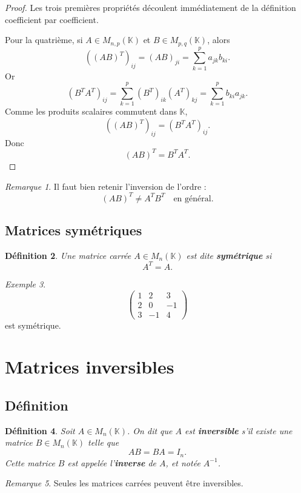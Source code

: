 \documentclass[11pt,a4paper]{article}
\newtheorem{definition}{Définition}[section]
\theoremstyle{remark}
\newtheorem{remarque}[definition]{Remarque}
\newtheorem{exemple}[definition]{Exemple}
\newcommand{\K}{\mathbb{K}}
\begin{document}
\begin{proof}
Les trois premières propriétés découlent immédiatement de la définition coefficient par coefficient.

Pour la quatrième, si \(A\in M_{n,p}(\K)\) et \(B\in M_{p,q}(\K)\), alors
\[
((AB)^T)_{ij}=(AB)_{ji}=\sum_{k=1}^p a_{jk}b_{ki}.
\]
Or
\[
(B^TA^T)_{ij}=\sum_{k=1}^p (B^T)_{ik}(A^T)_{kj}
=\sum_{k=1}^p b_{ki}a_{jk}.
\]
Comme les produits scalaires commutent dans \(\K\),
\[
((AB)^T)_{ij}=(B^TA^T)_{ij}.
\]
Donc
\[
(AB)^T=B^TA^T.
\]
\end{proof}

\begin{remarque}
Il faut bien retenir l’inversion de l’ordre :
\[
(AB)^T\neq A^TB^T \quad \text{en général.}
\]
\end{remarque}

\subsection{Matrices symétriques}

\begin{definition}
Une matrice carrée \(A\in M_n(\K)\) est dite \textbf{symétrique} si
\[
A^T=A.
\]
\end{definition}

\begin{exemple}
\[
\begin{pmatrix}
1 & 2 & 3\\
2 & 0 & -1\\
3 & -1 & 4
\end{pmatrix}
\]
est symétrique.
\end{exemple}

\section{Matrices inversibles}

\subsection{Définition}

\begin{definition}
Soit \(A\in M_n(\K)\).  
On dit que \(A\) est \textbf{inversible} s’il existe une matrice \(B\in M_n(\K)\) telle que
\[
AB=BA=I_n.
\]
Cette matrice \(B\) est appelée l’\textbf{inverse} de \(A\), et notée \(A^{-1}\).
\end{definition}

\begin{remarque}
Seules les matrices carrées peuvent être inversibles.
\end{remarque}
\end{document}
